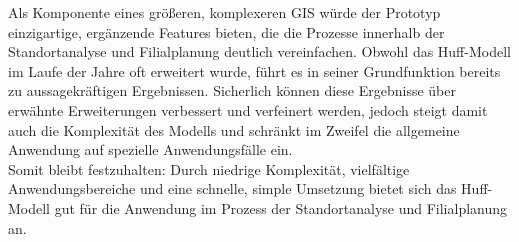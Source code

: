 Als Komponente eines größeren, komplexeren GIS würde der Prototyp einzigartige, ergänzende Features bieten, die die Prozesse innerhalb der Standortanalyse und Filialplanung deutlich vereinfachen.
Obwohl das Huff-Modell im Laufe der Jahre oft erweitert wurde, führt es in seiner Grundfunktion bereits zu aussagekräftigen Ergebnissen.
Sicherlich können diese Ergebnisse über erwähnte Erweiterungen verbessert und verfeinert werden, jedoch steigt damit auch die Komplexität des Modells und schränkt im Zweifel die allgemeine Anwendung auf spezielle Anwendungsfälle ein.\\
Somit bleibt festzuhalten: Durch niedrige Komplexität, vielfältige   Anwendungsbereiche und eine schnelle, simple Umsetzung bietet sich das Huff-Modell gut für die Anwendung im Prozess der Standortanalyse und Filialplanung an.